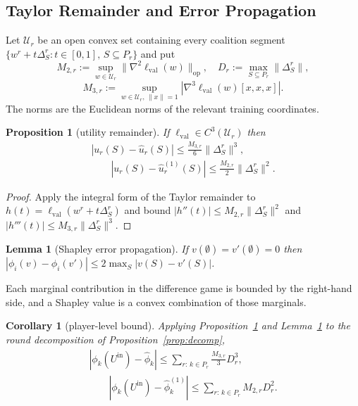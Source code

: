 \documentclass[letterpaper]{article} %
\theoremstyle{plain}
\newtheorem{proposition}{Proposition}
\newtheorem{lemma}{Lemma}
\newtheorem{corollary}{Corollary}
\newcommand{\lval}{\ell_{\mathrm{val}}}
\begin{document}
\subsection{Taylor Remainder and Error Propagation}
\label{app:remainder}

Let $\mathcal U_r$ be an open convex set containing every coalition segment
$\{w^r + t\Delta_S^r : t \in [0,1],\, S \subseteq P_r\}$ and put
\[
M_{2,r} := \sup_{w \in \mathcal U_r}\|\nabla^2\lval(w)\|_{\mathrm{op}}, \quad
D_r := \max_{S \subseteq P_r}\|\Delta_S^r\|,
\]
\[
M_{3,r} := \sup_{w \in \mathcal U_r,\, \|x\| = 1}
|\nabla^3\lval(w)[x,x,x]|.
\]
The norms are the Euclidean norms of the relevant training coordinates.

\begin{proposition}[utility remainder]
\label{prop:remainder}
If $\lval \in C^3(\mathcal U_r)$ then
\[
\begin{aligned}
|u_r(S) - \hat u_r(S)| \le \tfrac{M_{3,r}}{6}\|\Delta_S^r\|^3, 
\\
\qquad |u_r(S) - \hat u_r^{(1)}(S)| \le \tfrac{M_{2,r}}{2}\|\Delta_S^r\|^2.
\end{aligned}
\]
\end{proposition}

\begin{proof}
Apply the integral form of the Taylor remainder to
$h(t) = \lval(w^r + t\Delta_S^r)$ and bound
$|h''(t)| \le M_{2,r}\|\Delta_S^r\|^2$ and
$|h'''(t)| \le M_{3,r}\|\Delta_S^r\|^3$.
\end{proof}

\begin{lemma}[Shapley error propagation]
\label{lem:prop}
If $v(\emptyset) = v'(\emptyset) = 0$ then
$|\phi_i(v) - \phi_i(v')| \le 2\max_S |v(S) - v'(S)|$.
\end{lemma}

Each marginal contribution in the difference game is bounded by the
right-hand side, and a Shapley value is a convex combination of those
marginals.

\begin{corollary}[player-level bound]
\label{cor:player}
Applying Proposition~\ref{prop:remainder} and Lemma~\ref{lem:prop} to the
round decomposition of Proposition~\ref{prop:decomp},
\[
\begin{aligned}
|\phi_k(U^{\mathrm{in}}) - \hat\phi_k|
\le \sum_{r:\,k \in P_r} \tfrac{M_{3,r}}{3} D_r^3, 
\\
\qquad
|\phi_k(U^{\mathrm{in}}) - \hat\phi_k^{(1)}|
\le \sum_{r:\,k \in P_r} M_{2,r} D_r^2.
\end{aligned}
\]
\end{corollary}
\end{document}
